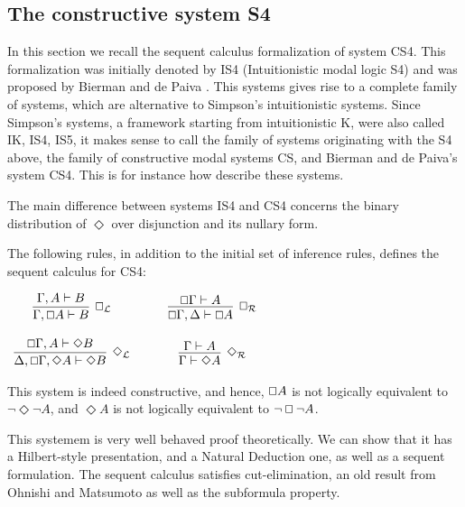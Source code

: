 \documentclass{article}
\renewcommand{\Box}{\oblong}
\begin{document}
\subsection{The constructive system S4} 

In this section we recall the sequent calculus formalization of system CS4.  This formalization was initially denoted by IS4 (Intuitionistic modal logic S4) and was proposed by
Bierman and de Paiva \cite{CS4}.  This systems gives rise to a complete family of systems, which are alternative to Simpson's intuitionistic systems. Since  Simpson's systems,  a framework starting from intuitionistic K,  were also called IK, IS4, IS5, it makes  sense to call the family of systems originating with the S4 above, the family of constructive modal systems CS, and Bierman and de Paiva's system CS4.  This is for instance how \cite{arisaka2015} describe these systems. 

The main difference between systems IS4 and CS4 concerns the binary distribution of $\Diamond$ over disjunction and its nullary form.

The following rules, in addition to
the initial set of inference rules, defines the sequent calculus for CS4:
\begin{center}
  \begin{math}
    \begin{array}{ccccc}              
      \infer[\Box_{\mathcal{L}}]{\Gamma, \Box A \vdash B}{
        \Gamma,A \vdash B
      }
      & \quad &
      \infer[\Box_{\mathcal{R}}]{\Box\Gamma,\Delta \vdash \Box A}{
        \Box \Gamma \vdash A
      }\\\\
      \infer[\Diamond_{\mathcal{L}}]{\Delta,\Box\Gamma,\Diamond A \vdash \Diamond B}{
        \Box\Gamma,A \vdash \Diamond B
      }
      & \quad &
      \infer[\Diamond_{\mathcal{R}}]{\Gamma \vdash \Diamond A}{
        \Gamma \vdash A
      }
    \end{array}        
  \end{math}
\end{center}
This system is indeed constructive, and hence, $\Box A$ is not
logically equivalent to $\lnot \Diamond \lnot A$, and $\Diamond A$ is
not logically equivalent to $\lnot \Box \lnot A$.

This systemem is very well behaved proof theoretically. We can show that it has a Hilbert-style presentation, and a Natural Deduction one, as well as a sequent formulation. The sequent calculus satisfies cut-elimination, an old result from Ohnishi and Matsumoto \cite{ohnishi1957} as well as the subformula property. 
\end{document}
